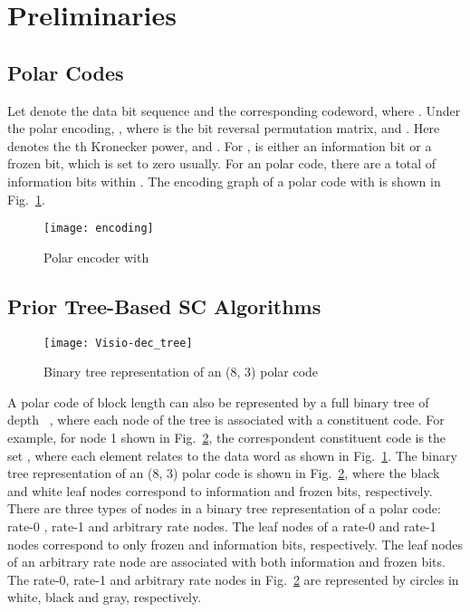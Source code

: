\documentclass[journal]{IEEEtran}
\begin{document}
\section{Preliminaries}
\label{sec: pre}

\subsection{Polar Codes} \label{ssec:polar_encoding}
Let  denote the data bit sequence and  the corresponding codeword, where . Under the polar encoding,  , where  is the bit reversal permutation matrix, and . Here  denotes the th Kronecker power,  and .
For ,  is either an information bit or a frozen bit, which is set to zero usually. For an  polar code, there are a total of  information bits within .
The encoding graph of a polar code with  is shown in Fig.~\ref{fig: encoding}.

\begin{figure} [hbt]
\centering
\texttt{[image: encoding]}
  \caption{Polar encoder with }\label{fig: encoding}
\end{figure}

\subsection{Prior Tree-Based SC Algorithms} \label{ssec: ssc}

\begin{figure} [hbt]
\centering
\texttt{[image: Visio-dec\_tree]}
  \caption{Binary tree representation of an (8, 3) polar code}\label{fig: dec_tree}
\end{figure}

A polar code of block length  can also be represented by a full binary tree  of depth ~\cite{low_latency_polar}, where each node of the tree is associated with a constituent code. For example, for node 1 shown in Fig.~\ref{fig: dec_tree}, the correspondent constituent code is the set , where each element  relates to the data word  as shown in Fig.~\ref{fig: encoding}. The binary tree representation of an (8, 3) polar code is shown in Fig.~\ref{fig: dec_tree}, where the black and white leaf nodes correspond to information and frozen bits, respectively. There are three types of nodes in a binary tree representation of a polar code: rate-0 , rate-1 and arbitrary rate nodes. The leaf nodes of a rate-0 and rate-1 nodes correspond to only frozen and information bits, respectively. The leaf nodes of an arbitrary rate node are associated with both information and frozen bits. The rate-0, rate-1 and arbitrary rate nodes in Fig.~\ref{fig: dec_tree} are represented by circles in white, black and gray, respectively.
\end{document}
